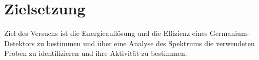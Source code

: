 \section{Zielsetzung}
\label{sec:Zielsetzung}

Ziel des Versuchs ist die Energieauflösung und die Effizienz eines Germanium-Detektors zu bestimmen und über eine Analyse des Spektrums die verwendeten Proben zu identifizieren und ihre Aktivität zu bestimmen.